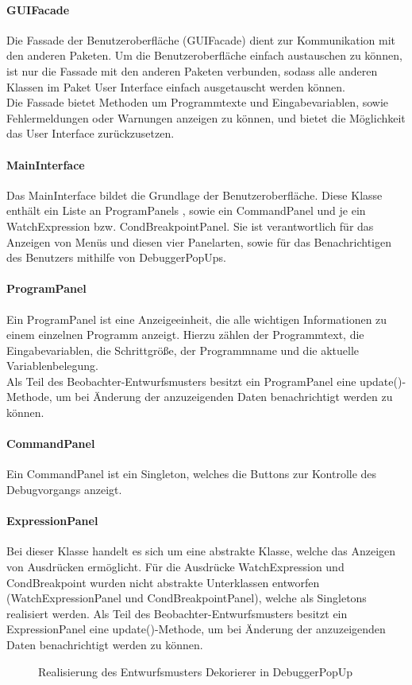 \documentclass[parskip=full]{scrartcl}
\begin{document}
\paragraph{GUIFacade}
Die Fassade der Benutzeroberfläche (GUIFacade) dient zur Kommunikation mit den anderen Paketen. Um die Benutzeroberfläche einfach austauschen zu können, ist nur die Fassade mit den anderen Paketen verbunden, sodass alle anderen Klassen im Paket User Interface einfach ausgetauscht werden können. \\
Die Fassade bietet Methoden um Programmtexte und Eingabevariablen, sowie Fehlermeldungen oder Warnungen anzeigen zu können, und bietet die Möglichkeit
das User Interface zurückzusetzen.
\paragraph{MainInterface}
 Das MainInterface bildet die Grundlage der Benutzeroberfläche. Diese Klasse enthält ein Liste an ProgramPanels , sowie ein CommandPanel und je ein WatchExpression bzw. CondBreakpointPanel. Sie ist verantwortlich für das Anzeigen von Menüs und diesen vier Panelarten, sowie für das Benachrichtigen des Benutzers mithilfe von DebuggerPopUps.
\paragraph{ProgramPanel}
Ein ProgramPanel ist eine Anzeigeeinheit, die alle wichtigen Informationen zu einem einzelnen Programm anzeigt. Hierzu zählen der Programmtext, die Eingabevariablen, die Schrittgröße, der Programmname und die aktuelle Variablenbelegung. \\
Als Teil des Beobachter-Entwurfsmusters besitzt ein ProgramPanel eine update()-Methode, um bei Änderung der anzuzeigenden Daten benachrichtigt werden zu können.
\paragraph{CommandPanel}
Ein CommandPanel ist ein Singleton, welches die Buttons zur Kontrolle des Debugvorgangs anzeigt. 
\paragraph{ExpressionPanel}
Bei dieser Klasse handelt es sich um eine abstrakte Klasse, welche das Anzeigen von Ausdrücken ermöglicht. Für die Ausdrücke WatchExpression und CondBreakpoint wurden nicht abstrakte Unterklassen entworfen (WatchExpressionPanel und CondBreakpointPanel), welche als Singletons realisiert werden.
Als Teil des Beobachter-Entwurfsmusters besitzt ein ExpressionPanel eine update()-Methode, um bei Änderung der anzuzeigenden Daten benachrichtigt werden zu können.
\begin{figure}[!h]
\centering
\caption{Realisierung des Entwurfsmusters Dekorierer in DebuggerPopUp}
\label{guidekorierer}
\end{figure}
\end{document}
